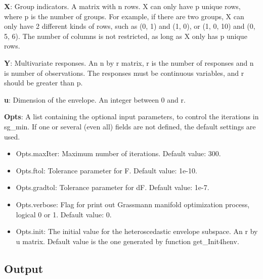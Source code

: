 \documentclass[a4paper,11pt,openany]{memoir}
\begin{document}
\begin{par}
\textbf{X}: Group indicators. A matrix with n rows.  X can only have p unique  rows, where p is the number of groups. For example, if there are two groups, X can only have 2 different kinds of rows, such as (0, 1) and (1, 0), or (1, 0, 10) and (0, 5, 6).  The number of columns is not restricted, as long as X only has p unique rows.
\end{par} \vspace{1em}
\begin{par}
\textbf{Y}: Multivariate responses. An n by r matrix, r is the number of responses and n is number of observations. The responses must be continuous variables, and r should be greater than p.
\end{par} \vspace{1em}
\begin{par}
\textbf{u}: Dimension of the envelope. An integer between 0 and r.
\end{par} \vspace{1em}
\begin{par}
\textbf{Opts}: A list containing the optional input parameters, to control the iterations in sg\_min. If one or several (even all) fields are not defined, the default settings are used.
\end{par} \vspace{1em}
\begin{itemize}
\setlength{\itemsep}{-1ex}
   \item Opts.maxIter: Maximum number of iterations.  Default value: 300.
   \item Opts.ftol: Tolerance parameter for F.  Default value: 1e-10.
   \item Opts.gradtol: Tolerance parameter for dF.  Default value: 1e-7.
   \item Opts.verbose: Flag for print out Grassmann manifold optimization process, logical 0 or 1. Default value: 0.
   \item Opts.init: The initial value for the heteroscedastic envelope subspace. An r by u matrix. Default value is the one generated by function get\_Init4henv.
\end{itemize}


\subsection*{Output}
\end{document}
